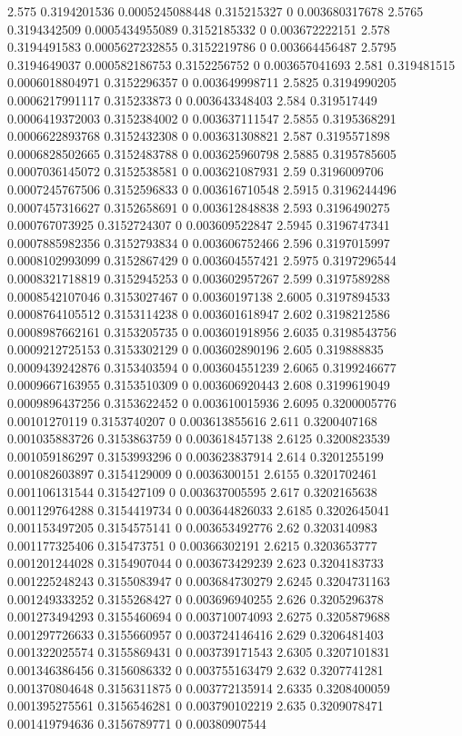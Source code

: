 {2.575 0.3194201536 0.0005245088448 0.315215327 0 0.003680317678
2.5765 0.3194342509 0.0005434955089 0.3152185332 0 0.003672222151
2.578 0.3194491583 0.0005627232855 0.3152219786 0 0.003664456487
2.5795 0.3194649037 0.000582186753 0.3152256752 0 0.003657041693
2.581 0.319481515 0.0006018804971 0.3152296357 0 0.003649998711
2.5825 0.3194990205 0.0006217991117 0.315233873 0 0.003643348403
2.584 0.319517449 0.0006419372003 0.3152384002 0 0.003637111547
2.5855 0.3195368291 0.0006622893768 0.3152432308 0 0.003631308821
2.587 0.3195571898 0.0006828502665 0.3152483788 0 0.003625960798
2.5885 0.3195785605 0.0007036145072 0.3152538581 0 0.003621087931
2.59 0.3196009706 0.0007245767506 0.3152596833 0 0.003616710548
2.5915 0.3196244496 0.0007457316627 0.3152658691 0 0.003612848838
2.593 0.3196490275 0.000767073925 0.3152724307 0 0.003609522847
2.5945 0.3196747341 0.0007885982356 0.3152793834 0 0.003606752466
2.596 0.3197015997 0.0008102993099 0.3152867429 0 0.003604557421
2.5975 0.3197296544 0.0008321718819 0.3152945253 0 0.003602957267
2.599 0.3197589288 0.0008542107046 0.3153027467 0 0.00360197138
2.6005 0.3197894533 0.0008764105512 0.3153114238 0 0.003601618947
2.602 0.3198212586 0.0008987662161 0.3153205735 0 0.003601918956
2.6035 0.3198543756 0.0009212725153 0.3153302129 0 0.003602890196
2.605 0.319888835 0.0009439242876 0.3153403594 0 0.003604551239
2.6065 0.3199246677 0.0009667163955 0.3153510309 0 0.003606920443
2.608 0.3199619049 0.0009896437256 0.3153622452 0 0.003610015936
2.6095 0.3200005776 0.00101270119 0.3153740207 0 0.003613855616
2.611 0.3200407168 0.001035883726 0.3153863759 0 0.003618457138
2.6125 0.3200823539 0.001059186297 0.3153993296 0 0.003623837914
2.614 0.3201255199 0.001082603897 0.3154129009 0 0.0036300151
2.6155 0.3201702461 0.001106131544 0.315427109 0 0.003637005595
2.617 0.3202165638 0.001129764288 0.3154419734 0 0.003644826033
2.6185 0.3202645041 0.001153497205 0.3154575141 0 0.003653492776
2.62 0.3203140983 0.001177325406 0.315473751 0 0.00366302191
2.6215 0.3203653777 0.001201244028 0.3154907044 0 0.003673429239
2.623 0.3204183733 0.001225248243 0.3155083947 0 0.003684730279
2.6245 0.3204731163 0.001249333252 0.3155268427 0 0.003696940255
2.626 0.3205296378 0.001273494293 0.3155460694 0 0.003710074093
2.6275 0.3205879688 0.001297726633 0.3155660957 0 0.003724146416
2.629 0.3206481403 0.001322025574 0.3155869431 0 0.003739171543
2.6305 0.3207101831 0.001346386456 0.3156086332 0 0.003755163479
2.632 0.3207741281 0.001370804648 0.3156311875 0 0.003772135914
2.6335 0.3208400059 0.001395275561 0.3156546281 0 0.003790102219
2.635 0.3209078471 0.001419794636 0.3156789771 0 0.00380907544
}
